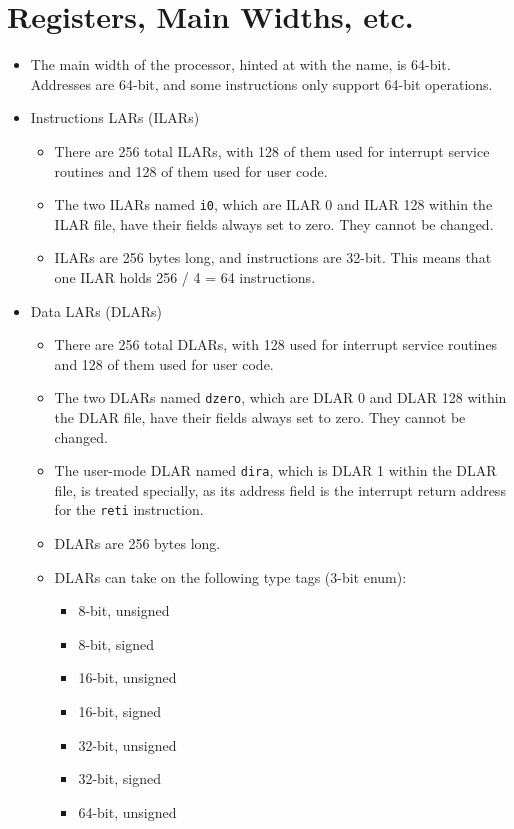 \documentclass{article}
\begin{document}
\section{Registers, Main Widths, etc.}
	\begin{itemize}
	\item The main width of the processor, hinted at with the name, is
		64-bit.  Addresses are 64-bit, and some instructions only support
		64-bit operations.
	\item Instructions LARs (ILARs)
		\begin{itemize}
		\item There are 256 total ILARs, with 128 of them used for
			interrupt service routines and 128 of them used for user code.
		\item The two ILARs named \texttt{i0}, which are ILAR 0 and ILAR
			128 within the ILAR file, have their fields always set to zero.
			They cannot be changed.
		\item ILARs are 256 bytes long, and instructions are 32-bit.  This
			means that one ILAR holds 256 / 4 = 64 instructions.
		\end{itemize}
	\item Data LARs (DLARs)
		\begin{itemize}
		\item There are 256 total DLARs, with 128 used for interrupt
			service routines and 128 of them used for user code.
		\item The two DLARs named \texttt{dzero}, which are DLAR 0 and DLAR
			128 within the DLAR file, have their fields always set to zero.
			They cannot be changed.
		\item The user-mode DLAR named \texttt{dira}, which is DLAR 1
			within the DLAR file, is treated specially, as its address
			field is the interrupt return address for the \texttt{reti}
			instruction.
		\item DLARs are 256 bytes long.
		\item DLARs can take on the following type tags (3-bit enum):
			\begin{itemize}
			\item 8-bit, unsigned
			\item 8-bit, signed
			\item 16-bit, unsigned
			\item 16-bit, signed
			\item 32-bit, unsigned
			\item 32-bit, signed
			\item 64-bit, unsigned

\end{itemize}
\end{itemize}
\end{itemize}
\end{document}
